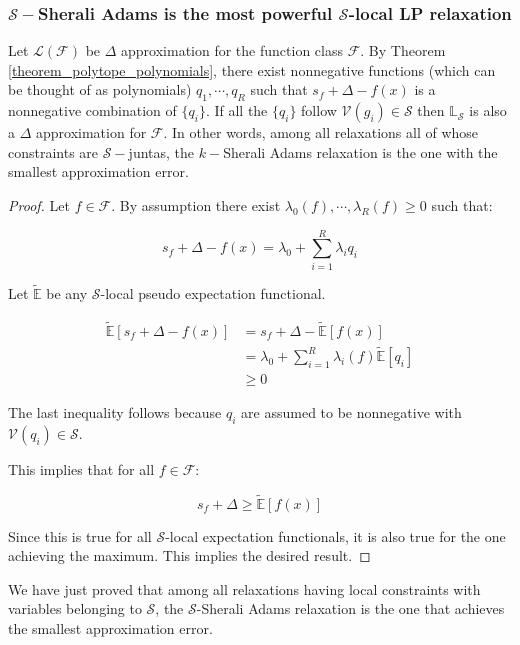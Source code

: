 
\subsubsection{ $\mathcal{S}-$Sherali Adams is the most powerful $\mathcal{S}$-local LP relaxation }


\begin{theorem}
Let $\mathcal{L}(\mathcal{F})$ be $\Delta$ approximation for the function class $\mathcal{F}$. By Theorem \ref{theorem_polytope_polynomials}, there exist nonnegative functions (which can be thought of as polynomials) $q_1, \cdots, q_R$ such that $s_f + \Delta - f(x)$ is a nonnegative combination of $\{q_i\}$. If all the $\{q_i\}$ follow $\mathcal{V}(g_i) \in \mathcal{S}$ then $\mathbb{L}_\mathcal{S}$ is also a $\Delta$ approximation for $\mathcal{F}$.
In other words, among all relaxations all of whose constraints are $\mathcal{S}-$juntas, the $k-$Sherali Adams relaxation is the one with the smallest approximation error. 
\end{theorem}

\begin{proof}
Let $f \in \mathcal{F}$. By assumption there exist $\lambda_0(f), \cdots, \lambda_R(f) \geq 0$ such that:

\begin{equation}
s_f + \Delta - f(x) = \lambda_0 + \sum_{i=1}^R \lambda_i q_i
\end{equation}

Let $\tilde{\mathbb{E}}$ be any $\mathcal{S}$-local pseudo expectation functional. 

\begin{align}
\tilde{\mathbb{E}}[s_f + \Delta - f(x)] &= s_f + \Delta - \tilde{\mathbb{E}}[f(x)] \\
&= \lambda_0 + \sum_{i=1}^R\lambda_i(f) \tilde{\mathbb{E}}[q_i] \\
&\geq 0
\end{align}

The last inequality follows because $q_i$ are assumed to be nonnegative with $\mathcal{V}(q_i)\in \mathcal{S}$.

This implies that for all $f \in \mathcal{F}$:

\begin{equation}
s_f + \Delta  \geq \tilde{\mathbb{E}}[f(x)]
\end{equation}

Since this is true for all $\mathcal{S}$-local expectation functionals, it is also true for the one achieving the maximum. This implies the desired result.

\end{proof}


We have just proved that among all relaxations having local constraints with variables belonging to $\mathcal{S}$, the $\mathcal{S}$-Sherali Adams relaxation is the one that achieves the smallest approximation error.
